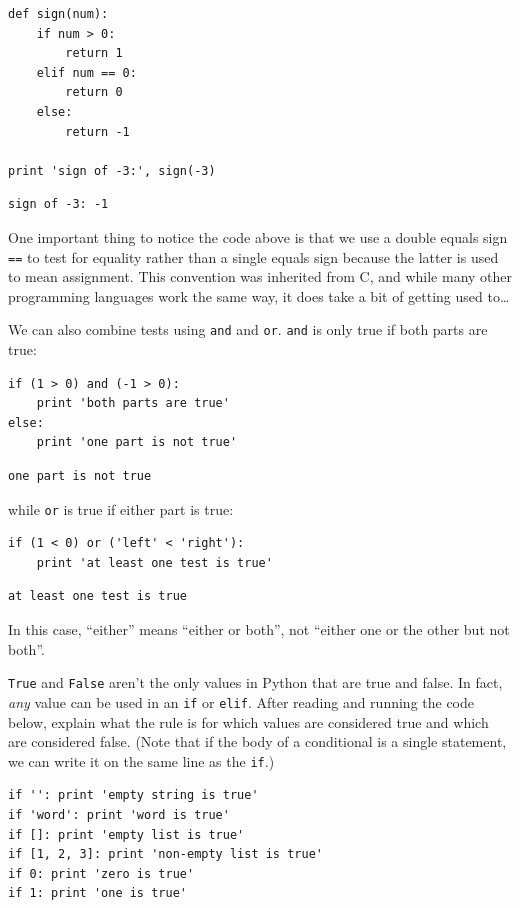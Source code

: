 \documentclass{book}
\begin{document}
\begin{verbatim}
def sign(num):
    if num > 0:
        return 1
    elif num == 0:
        return 0
    else:
        return -1

print 'sign of -3:', sign(-3)
\end{verbatim}

\begin{verbatim}
sign of -3: -1
\end{verbatim}

One important thing to notice the code above is that we use a double
equals sign \texttt{==} to test for equality rather than a single equals
sign because the latter is used to mean assignment. This convention was
inherited from C, and while many other programming languages work the
same way, it does take a bit of getting used to\ldots{}

We can also combine tests using \texttt{and} and \texttt{or}.
\texttt{and} is only true if both parts are true:

\begin{verbatim}
if (1 > 0) and (-1 > 0):
    print 'both parts are true'
else:
    print 'one part is not true'
\end{verbatim}

\begin{verbatim}
one part is not true
\end{verbatim}

while \texttt{or} is true if either part is true:

\begin{verbatim}
if (1 < 0) or ('left' < 'right'):
    print 'at least one test is true'
\end{verbatim}

\begin{verbatim}
at least one test is true
\end{verbatim}

In this case, ``either'' means ``either or both'', not ``either one or
the other but not both''.

\begin{challenge}
  \texttt{True} and \texttt{False} aren't the only values in Python that
  are true and false. In fact, \emph{any} value can be used in an
  \texttt{if} or \texttt{elif}. After reading and running the code
  below, explain what the rule is for which values are considered true
  and which are considered false. (Note that if the body of a
  conditional is a single statement, we can write it on the same line as
  the \texttt{if}.)

\begin{verbatim}
if '': print 'empty string is true'
if 'word': print 'word is true'
if []: print 'empty list is true'
if [1, 2, 3]: print 'non-empty list is true'
if 0: print 'zero is true'
if 1: print 'one is true'
\end{verbatim}
\end{challenge}
\end{document}
